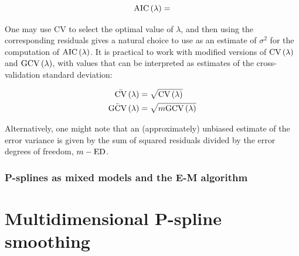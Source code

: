 \documentclass[12pt]{article}
\newcommand*\needsparaphrased{\color{red}}
\theoremstyle{definition}
\begin{document}
\begin{equation} \label{eq:univariate_AIC}
\textup{AIC}\left(\lambda\right) = %
\end{equation}

One may use CV to select the optimal value of $\lambda$, and then using the corresponding residuals gives a natural choice to use as an estimate of $\sigma^2$ for the computation of $\textup{AIC}\left(\lambda\right)$. It is practical to work with modified versions of $\textup{CV}\left(\lambda\right)$ and $\textup{GCV}\left(\lambda\right)$, with values that can be interpreted as estimates of the cross-validation standard deviation:

\begin{equation}
\begin{split}
\bar{\textup{CV}}\left(\lambda\right) &= \sqrt{\textup{CV}\left(\lambda\right)} \\
\bar{\textup{GCV}}\left(\lambda\right) &= \sqrt{m\textup{GCV}\left(\lambda\right)} \\
\end{split}
\end{equation}

Alternatively, one might note that an (approximately) unbiased estimate of the error variance is given by the sum of squared residuals divided by the error degrees of freedom, $m-\textup{ED}$.

\subsubsection{P-splines as mixed models and the E-M algorithm}




\section{Multidimensional P-spline smoothing}

\begin{framed}
{ \needsparaphrased{ 
Loop the readers back to the original problem: estimating the $\phi\left(s,t \right) = \phi^*\left(l,m\right)$, which is the generalized autoregressive surface of interest when we model
\[
y\left(t\right) = \sum_{s < t} \phi\left(t,s\right) y\left(s\right) + \epsilon\left(t\right).
\] 
We need a way of extending the modeling framework discussed in the previous sections to multidimensional coefficient functions.
}  }
\end{framed}
\end{document}
